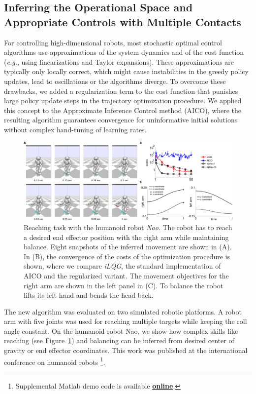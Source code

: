 \documentclass[final,5p,twocolumn]{elsarticle}
\begin{document}
\subsection{Inferring the Operational Space and Appropriate Controls with Multiple Contacts}

For controlling high-dimensional robots, most stochastic optimal control
algorithms use approximations of the system dynamics and of the cost function
(\textit{e.g.}, using linearizations and Taylor expansions). These approximations are
typically only locally correct, which might cause instabilities in the greedy
policy updates, lead to oscillations or the algorithms diverge. To overcome
these drawbacks, we added a regularization term to the cost function that punishes
large policy update steps in the trajectory optimization procedure. We applied
this concept to the Approximate Inference Control method (AICO), where the
resulting algorithm guarantees convergence for uninformative initial solutions
without complex hand-tuning of learning rates. 

\begin{figure}[t]
  \begin{center}
  \includegraphics[width=\linewidth]{./sections/WP4/pics_elmar/NaoReachingTask.png}
  \end{center}
  \caption{Reaching task with the humanoid robot \textit{Nao}. The robot has to
reach  a desired end effector position with the right arm while maintaining
balance. Eight snapshots of the inferred movement are shown in (A). In (B), the
convergence of the costs of the optimization procedure is shown, where we
compare \textit{iLQG}, the standard implementation of AICO and the regularized
variant. The movement objectives for the right arm are shown in the left panel
in (C). To balance the robot lifts its left hand and bends the head back.}
  \label{fig:naoReachingTask}
  \end{figure}

The new algorithm was evaluated on
two simulated robotic platforms. A robot arm with five joints was used for
reaching multiple targets while keeping the roll angle constant. On the humanoid
robot Nao, we show how complex skills like reaching (see Figure~\ref{fig:naoReachingTask}) and balancing can be
inferred from desired center of gravity or end effector coordinates. This work was published at 
the international conference on humanoid robots \cite{Rueckert2014}\footnote{Supplemental Matlab demo code is available \href{http://www.ausy.tu-darmstadt.de/Team/ElmarRueckert}{\textbf{online}}.}. 
\end{document}
